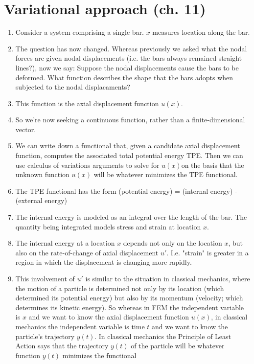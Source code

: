 \section{Variational approach (ch. 11)}
\begin{enumerate}
\item Consider a system comprising a single bar. $x$ measures location along the bar.
\item The question has now changed. Whereas previously we asked what the nodal forces are given nodal displacements (i.e. the bars always remained
  straight lines?), now we say: Suppose the nodal displacements cause the bars to be deformed. What function describes the shape that the bars adopts
  when subjected to the nodal displacaments?
\item This function is the axial displacement function $u(x)$.
\item So we're now seeking a continuous function, rather than a finite-dimensional vector.
\item We can write down a functional that, given a candidate axial displacement function, computes the associated total potential energy TPE. Then we can
  use calculus of variations arguments to solve for $u(x)$on the basis that the unknown function $u(x)$ will be whatever minimizes the TPE functional.
\item The TPE functional has the form (potential energy) = (internal energy) - (external energy)
\item The internal energy is modeled as an integral over the length of the bar. The quantity being integrated models stress and strain at location
  $x$.
\item The internal energy at a location $x$ depends not only on the location $x$, but also on the rate-of-change of axial displacement $u'$. I.e. "strain"
  is greater in a region in which the displacement is changing more rapidly.
\item This involvement of $u'$ is similar to the situation in classical mechanics, where the motion of a particle is determined not only by its location
  (which determined its potential energy) but also by its momentum (velocity; which determines its kinetic energy). So whereas in FEM the independent
  variable is $x$ and we want to know the axial displacement function $u(x)$, in classical mechanics the independent variable is time $t$ and we want
  to know the particle's trajectory $y(t)$. In classical mechanics the Principle of Least Action says that the trajectory $y(t)$ of the particle will
  be whatever function $y(t)$ minimizes the functional

\end{enumerate}
